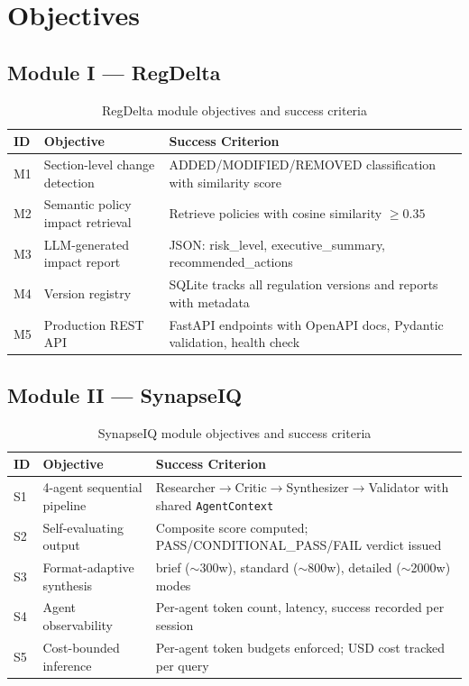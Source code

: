\documentclass[12pt,letterpaper]{article}
\begin{document}
\section{Objectives}

\subsection{Module I --- RegDelta}

\begin{table}[h!]
\centering
\begin{tabular}{C{0.6cm} L{4.5cm} L{8.4cm}}
\toprule
\textbf{ID} & \textbf{Objective} & \textbf{Success Criterion} \\
\midrule
M1 & Section-level change detection   & ADDED/MODIFIED/REMOVED classification with similarity score \\
M2 & Semantic policy impact retrieval & Retrieve policies with cosine similarity $\geq 0.35$ \\
M3 & LLM-generated impact report      & JSON: risk\_level, executive\_summary, recommended\_actions \\
M4 & Version registry                 & SQLite tracks all regulation versions and reports with metadata \\
M5 & Production REST API              & FastAPI endpoints with OpenAPI docs, Pydantic validation, health check \\
\bottomrule
\end{tabular}
\caption{RegDelta module objectives and success criteria}
\end{table}

\subsection{Module II --- SynapseIQ}

\begin{table}[h!]
\centering
\begin{tabular}{C{0.6cm} L{4.5cm} L{8.4cm}}
\toprule
\textbf{ID} & \textbf{Objective} & \textbf{Success Criterion} \\
\midrule
S1 & 4-agent sequential pipeline  & Researcher$\to$Critic$\to$Synthesizer$\to$Validator with shared \texttt{AgentContext} \\
S2 & Self-evaluating output       & Composite score computed; PASS/CONDITIONAL\_PASS/FAIL verdict issued \\
S3 & Format-adaptive synthesis    & brief ($\sim$300w), standard ($\sim$800w), detailed ($\sim$2000w) modes \\
S4 & Agent observability          & Per-agent token count, latency, success recorded per session \\
S5 & Cost-bounded inference       & Per-agent token budgets enforced; USD cost tracked per query \\
\bottomrule
\end{tabular}
\caption{SynapseIQ module objectives and success criteria}
\end{table}
\end{document}
